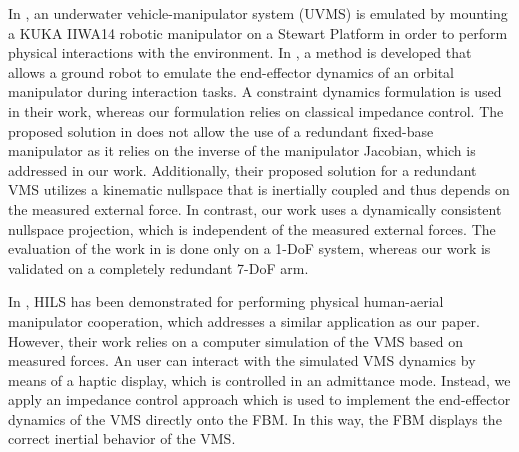 \documentclass[../main.tex]{subfiles}
\begin{document}


In \cite{cetin2022}, an underwater vehicle-manipulator system (UVMS) is emulated by mounting a KUKA IIWA14 robotic manipulator on a Stewart Platform in order to perform physical interactions with the environment. In \cite{aghili2002}, a method is developed that allows a ground robot
to emulate the end-effector dynamics of an orbital manipulator during interaction tasks. A constraint dynamics formulation is used in their work, whereas our formulation relies on classical impedance control. The proposed solution in \cite{aghili2002} does not allow the use of a redundant fixed-base manipulator as it relies on the inverse of the manipulator Jacobian, which is addressed in our work. Additionally, their proposed solution for a redundant VMS utilizes a kinematic nullspace that is inertially coupled and thus depends on the measured external force. In contrast, our work uses a dynamically consistent nullspace projection, which is independent of the measured external forces. The evaluation of the work in \cite{aghili2002} is done only on a 1-DoF system, whereas our work is validated on a completely redundant 7-DoF arm.



In \cite{cuniato2021hardware},  HILS has been demonstrated for performing physical human-aerial manipulator cooperation, which addresses a similar application as our paper. However, their work relies on a computer simulation of the VMS based on measured forces. An user can interact with the simulated VMS dynamics by means of a haptic display, which is controlled in an admittance mode. Instead, we apply an impedance control approach which is used to implement the end-effector dynamics of the VMS directly onto the FBM. In this way, the FBM displays the correct inertial behavior of the VMS.
\end{document}
